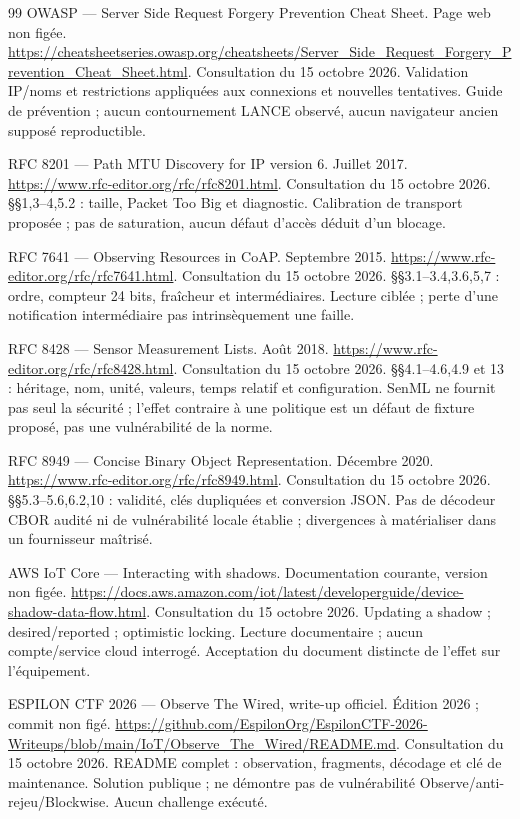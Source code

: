 \documentclass[11pt,a4paper]{article}
\begin{document}
\begin{thebibliography}{99}
 OWASP --- Server Side Request Forgery Prevention Cheat Sheet. Page web non figée. \url{https://cheatsheetseries.owasp.org/cheatsheets/Server_Side_Request_Forgery_Prevention_Cheat_Sheet.html}. Consultation du 15 octobre 2026. Validation IP/noms et restrictions appliquées aux connexions et nouvelles tentatives. Guide de prévention ; aucun contournement LANCE observé, aucun navigateur ancien supposé reproductible.

 RFC 8201 --- Path MTU Discovery for IP version 6. Juillet 2017. \url{https://www.rfc-editor.org/rfc/rfc8201.html}. Consultation du 15 octobre 2026. §§1,3--4,5.2 : taille, Packet Too Big et diagnostic. Calibration de transport proposée ; pas de saturation, aucun défaut d'accès déduit d'un blocage.

 RFC 7641 --- Observing Resources in CoAP. Septembre 2015. \url{https://www.rfc-editor.org/rfc/rfc7641.html}. Consultation du 15 octobre 2026. §§3.1--3.4,3.6,5,7 : ordre, compteur 24 bits, fraîcheur et intermédiaires. Lecture ciblée ; perte d'une notification intermédiaire pas intrinsèquement une faille.

 RFC 8428 --- Sensor Measurement Lists. Août 2018. \url{https://www.rfc-editor.org/rfc/rfc8428.html}. Consultation du 15 octobre 2026. §§4.1--4.6,4.9 et 13 : héritage, nom, unité, valeurs, temps relatif et configuration. SenML ne fournit pas seul la sécurité ; l'effet contraire à une politique est un défaut de fixture proposé, pas une vulnérabilité de la norme.

 RFC 8949 --- Concise Binary Object Representation. Décembre 2020. \url{https://www.rfc-editor.org/rfc/rfc8949.html}. Consultation du 15 octobre 2026. §§5.3--5.6,6.2,10 : validité, clés dupliquées et conversion JSON. Pas de décodeur CBOR audité ni de vulnérabilité locale établie ; divergences à matérialiser dans un fournisseur maîtrisé.

 AWS IoT Core --- Interacting with shadows. Documentation courante, version non figée. \url{https://docs.aws.amazon.com/iot/latest/developerguide/device-shadow-data-flow.html}. Consultation du 15 octobre 2026. Updating a shadow ; desired/reported ; optimistic locking. Lecture documentaire ; aucun compte/service cloud interrogé. Acceptation du document distincte de l'effet sur l'équipement.

 ESPILON CTF 2026 --- Observe The Wired, write-up officiel. Édition 2026 ; commit non figé. \url{https://github.com/EspilonOrg/EspilonCTF-2026-Writeups/blob/main/IoT/Observe_The_Wired/README.md}. Consultation du 15 octobre 2026. README complet : observation, fragments, décodage et clé de maintenance. Solution publique ; ne démontre pas de vulnérabilité Observe/anti-rejeu/Blockwise. Aucun challenge exécuté.


\end{thebibliography}
\end{document}
